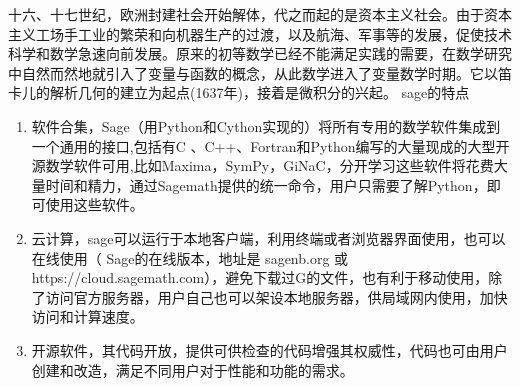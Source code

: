\documentclass[a4paper]{article}
\begin{document}
十六、十七世纪，欧洲封建社会开始解体，代之而起的是资本主义社会。由于资本主义工场手工业的繁荣和向机器生产的过渡，以及航海、军事等的发展，促使技术科学和数学急速向前发展。原来的初等数学已经不能满足实践的需要，在数学研究中自然而然地就引入了变量与函数的概念，从此数学进入了变量数学时期。它以笛卡儿的解析几何的建立为起点(1637年)，接着是微积分的兴起。%
sage的特点
\begin{enumerate}
\item 软件合集，Sage（用Python和Cython实现的）将所有专用的数学软件集成到一个通用的接口,包括有C 、C++、Fortran和Python编写的大量现成的大型开源数学软件可用,比如Maxima，SymPy，GiNaC，分开学习这些软件将花费大量时间和精力，通过Sagemath提供的统一命令，用户只需要了解Python，即可使用这些软件。
\item 云计算，sage可以运行于本地客户端，利用终端或者浏览器界面使用，也可以在线使用（ Sage的在线版本，地址是 sagenb.org 或 https://cloud.sagemath.com），避免下载过G的文件，也有利于移动使用，除了访问官方服务器，用户自己也可以架设本地服务器，供局域网内使用，加快访问和计算速度。
\item 开源软件，其代码开放，提供可供检查的代码增强其权威性，代码也可由用户创建和改造，满足不同用户对于性能和功能的需求。 
\end{enumerate}
\end{document}

